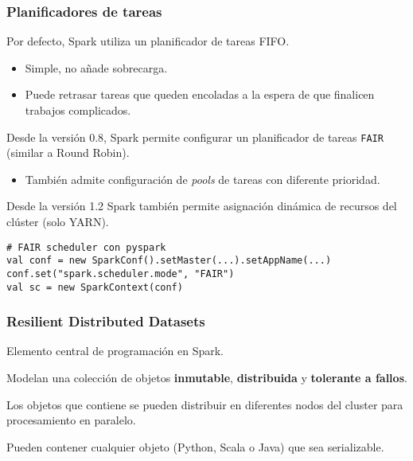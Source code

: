 
\begin{frame}[fragile]
  \frametitle{Planificadores de tareas}
    \begin{wideitemize}
      \item Por defecto, Spark utiliza un planificador de tareas FIFO.
      \begin{itemize}
       \item Simple, no añade sobrecarga.
       \item Puede retrasar tareas que queden encoladas a la espera de que
       finalicen trabajos complicados.
      \end{itemize}

    \item Desde la versión 0.8, Spark permite configurar un planificador de tareas
    \texttt{FAIR} (similar a Round Robin).
    \begin{itemize}
     \item También admite configuración de \textit{pools} de tareas con diferente
     prioridad.
    \end{itemize}
    
    \item Desde la versión 1.2 Spark también permite asignación dinámica de recursos
   del clúster (solo YARN).

    \end{wideitemize}
  \fontsize{8pt}{12pt}\selectfont
  \begin{verbatim}
# FAIR scheduler con pyspark
val conf = new SparkConf().setMaster(...).setAppName(...)
conf.set("spark.scheduler.mode", "FAIR")
val sc = new SparkContext(conf)
  \end{verbatim}

\end{frame}


\begin{frame}[fragile]
  \frametitle{Resilient Distributed Datasets}
    \begin{wideitemize}
      \item Elemento central de programación en Spark.
      \item Modelan una colección de objetos \textbf{inmutable}, \textbf{distribuida}
      y \textbf{tolerante a fallos}.
      \item Los objetos que contiene se pueden distribuir en diferentes nodos
      del cluster para procesamiento en paralelo.
      \item Pueden contener cualquier objeto (Python, Scala o Java) que sea
      serializable.
    \end{wideitemize}
\end{frame}

